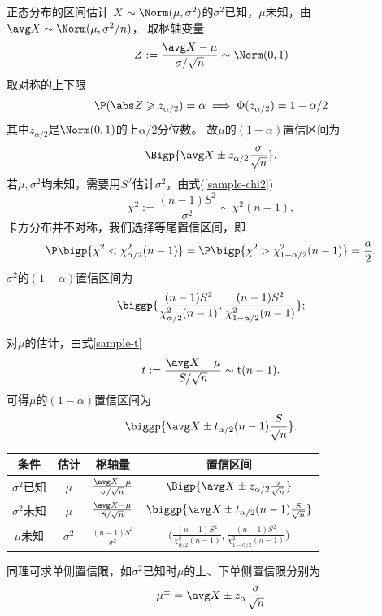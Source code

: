\begin{example}{正态分布的区间估计}{}
	$X\sim\Norm(\mu,\sigma^2)$的$\sigma^2$已知，$\mu$未知，由$\avg X\sim\Norm(\mu,\sigma^2/n)$，
	取枢轴变量
	\[
		Z:=\frac{\avg X-\mu}{\sigma/\sqrt n}\sim\Norm(0,1)
	\]
	取对称的上下限
	\[
		\P(\abs Z\geqslant z_{\alpha/2})=\alpha\implies\Phi(z_{\alpha/2})=1-\alpha/2
	\]
	其中$z_{\alpha/2}$是$\Norm(0,1)$的上$\alpha/2$分位数。
	故$\mu$的$(1-\alpha)$置信区间为
	\begin{equation}
		\Bigp{\avg X\pm z_{\alpha/2}\frac\sigma{\sqrt n}}.
	\end{equation}
	\tcblower
	若$\mu,\sigma^2$均未知，需要用$S^2$估计$\sigma^2$，由式(\ref{sample-chi2})
	\[
		\chi^2:=\frac{(n-1)S^2}{\sigma^2}\sim\chi^2(n-1),
	\]
	卡方分布并不对称，我们选择等尾置信区间，即
	\[
		\P\bigp{\chi^2<\chi_{\alpha/2}^2(n-1)}=\P\bigp{\chi^2>\chi_{1-\alpha/2}^2(n-1)}=\frac\alpha{2},
	\]
	$\sigma^2$的$(1-\alpha)$置信区间为
	\begin{equation}
		\biggp{\frac{(n-1)S^2}{\chi_{\alpha/2}^2(n-1)},\frac{(n-1)S^2}{\chi_{1-\alpha/2}^2(n-1)}};
	\end{equation}

	对$\mu$的估计，由式\eqref{sample-t}
	\[
		t:=\frac{\avg X-\mu}{S/\sqrt n}\sim\mathrm t(n-1).
	\]
	可得$\mu$的$(1-\alpha)$置信区间为
	\begin{equation}
		\biggp{\avg X\pm t_{\alpha/2}(n-1)\frac{S}{\sqrt n}}.
	\end{equation}
	\begin{center}
		\begin{tabular}{cccc}
			\toprule
			条件&估计&枢轴量&置信区间\\
			\midrule
			$\sigma^2$已知&$\mu$&$\frac{\avg X-\mu}{\sigma/\sqrt n}$&$\Bigp{\avg X\pm z_{\alpha/2}\frac\sigma{\sqrt n}}$\\[2ex]
			$\sigma^2$未知&$\mu$&$\frac{\avg X-\mu}{S/\sqrt n}$&$\biggp{\avg X\pm t_{\alpha/2}(n-1)\frac S{\sqrt n}}$\\[2ex]
			$\mu$未知&$\sigma^2$&$\frac{(n-1)S^2}{\sigma^2}$&$\biggl(\frac{(n-1)S^2}{\chi_{\alpha/2}^2(n-1)},\frac{(n-1)S^2}{\chi_{1-\alpha/2}^2(n-1)}\biggr)$\\
			\bottomrule
		\end{tabular}
	\end{center}
	同理可求单侧置信限，如$\sigma^2$已知时$\mu$的上、下单侧置信限分别为
	\[
		\mu^\pm=\avg X\pm z_\alpha\frac\sigma{\sqrt n}
	\]
\end{example}
